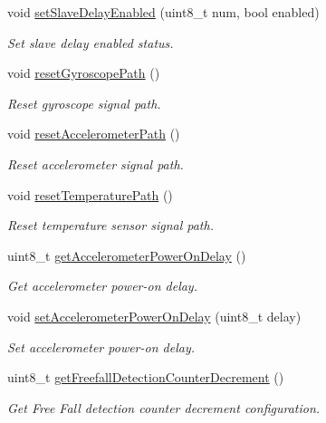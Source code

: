 \begin{DoxyCompactItemize}
void \mbox{\hyperlink{classMPU6050_a471929d7cf9049357c345633d22412a9}{set\+Slave\+Delay\+Enabled}} (uint8\+\_\+t num, bool enabled)
\begin{DoxyCompactList}\small\item\em Set slave delay enabled status. \end{DoxyCompactList}\item 
void \mbox{\hyperlink{classMPU6050_af1599c0d70f07fd3e28683d571842c22}{reset\+Gyroscope\+Path}} ()
\begin{DoxyCompactList}\small\item\em Reset gyroscope signal path. \end{DoxyCompactList}\item 
void \mbox{\hyperlink{classMPU6050_a99ee74708c12f32e48ef5ec69ac9f4a9}{reset\+Accelerometer\+Path}} ()
\begin{DoxyCompactList}\small\item\em Reset accelerometer signal path. \end{DoxyCompactList}\item 
void \mbox{\hyperlink{classMPU6050_a559c2d091d36a4e0489bc639916ddbb6}{reset\+Temperature\+Path}} ()
\begin{DoxyCompactList}\small\item\em Reset temperature sensor signal path. \end{DoxyCompactList}\item 
uint8\+\_\+t \mbox{\hyperlink{classMPU6050_aae903df2accc687423f9cd0a78f9cd32}{get\+Accelerometer\+Power\+On\+Delay}} ()
\begin{DoxyCompactList}\small\item\em Get accelerometer power-\/on delay. \end{DoxyCompactList}\item 
void \mbox{\hyperlink{classMPU6050_a2bbde7653d2d2d37e16e515599f3b08b}{set\+Accelerometer\+Power\+On\+Delay}} (uint8\+\_\+t delay)
\begin{DoxyCompactList}\small\item\em Set accelerometer power-\/on delay. \end{DoxyCompactList}\item 
uint8\+\_\+t \mbox{\hyperlink{classMPU6050_af6d6fa9869636989a8b29c4827ad7de8}{get\+Freefall\+Detection\+Counter\+Decrement}} ()
\begin{DoxyCompactList}\small\item\em Get Free Fall detection counter decrement configuration. \end{DoxyCompactList}\item 

\end{DoxyCompactItemize}
